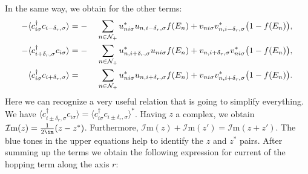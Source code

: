 \documentclass[../main.tex]{subfile}
\begin{document}
In the same way, we obtain for the other terms:
\begin{alignat*}{2}
    -\color{TamGreen}{\langle c_{i\sigma}^{\dagger}c_{i-\delta_{r},\sigma}\rangle} &= -&\sum_{n\in\mathcal{N}_+} u_{ni\sigma}^{\ast}u_{n,i-\delta_r,\sigma} f(E_n) + v_{ni\sigma}v_{n,i-\delta_r,\sigma}^{\ast}\bigl(1-f(E_n)\bigr),\\
    -\color{TamTangerine}{\langle c_{i+\delta_{r},\sigma}^{\dagger}c_{i\sigma}\rangle} &= -&\sum_{n\in\mathcal{N}_+} u_{n,i+\delta_r,\sigma}^{\ast}u_{ni\sigma} f(E_n) + v_{n,i+\delta_r,\sigma}v_{ni\sigma}^{\ast}\bigl(1-f(E_n)\bigr),\\
    \color{TamTangerine}{\langle c_{i\sigma}^{\dagger}c_{i+\delta_{r},\sigma}\rangle} &=  &~\sum_{n\in\mathcal{N}_+} u_{ni\sigma}^{\ast}u_{n,i+\delta_r,\sigma} f(E_n) + v_{ni\sigma}v_{n,i+\delta_r,\sigma}^{\ast}\bigl(1-f(E_n)\bigr).
\end{alignat*}
Here we can recognize a very useful relation that is going to simplify everything. We have $\langle c_{i\pm\delta_r,\sigma}^{\dagger} c_{i\sigma}\rangle = \langle c_{i\sigma}^{\dagger}c_{i\pm\delta_{r},\sigma} \rangle^{\ast}$.
Having $z$ a complex, we obtain $\mathcal{I}\text{m}(z) = \frac{1}{2\im}(z-z^{\ast})$. Furthermore, $\mathcal{I}\text{m}(z)+\mathcal{I}\text{m}(z') = \mathcal{I}\text{m}(z+z')$.
The blue tones in the upper equations help to identify the $z$ and $z^{\ast}$ pairs.
After summing up the terms we obtain the following expression for current of the hopping term along the axis $r$:
\end{document}
